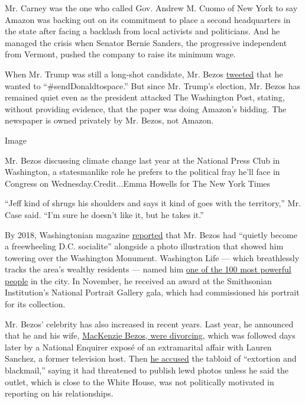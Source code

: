 Mr. Carney was the one who called Gov. Andrew M. Cuomo of New York to
say Amazon was backing out on its commitment to place a second
headquarters in the state after facing a backlash from local activists
and politicians. And he managed the crisis when Senator Bernie Sanders,
the progressive independent from Vermont, pushed the company to raise
its minimum wage.

When Mr. Trump was still a long-shot candidate, Mr. Bezos
\href{https://twitter.com/JeffBezos/status/674008204838199297}{tweeted}
that he wanted to ``\#sendDonaldtospace.'' But since Mr. Trump's
election, Mr. Bezos has remained quiet even as the president attacked
The Washington Post, stating, without providing evidence, that the paper
was doing Amazon's bidding. The newspaper is owned privately by Mr.
Bezos, not Amazon.

Image

Mr. Bezos discussing climate change last year at the National Press Club
in Washington, a statesmanlike role he prefers to the political fray
he'll face in Congress on Wednesday.Credit...Emma Howells for The New
York Times

``Jeff kind of shrugs his shoulders and says it kind of goes with the
territory,'' Mr. Case said. ``I'm sure he doesn't like it, but he takes
it.''

By 2018, Washingtonian magazine
\href{https://www.washingtonian.com/2018/04/22/inside-jeff-bezos-dc-life/}{reported}
that Mr. Bezos had ``quietly become a freewheeling D.C. socialite''
alongside a photo illustration that showed him towering over the
Washington Monument. Washington Life --- which breathlessly tracks the
area's wealthy residents --- named him
\href{https://washingtonlife.com/2018/05/10/business-real-estate-jeff-bezos/}{one
of the 100 most powerful people} in the city. In November, he received
an award at the Smithsonian Institution's National Portrait Gallery
gala, which had commissioned his portrait for its collection.

Mr. Bezos' celebrity has also increased in recent years. Last year, he
announced that he and his wife,
\href{https://www.nytimes3xbfgragh.onion/2019/05/28/us/mackenzie-bezos-charity.html}{MacKenzie
Bezos, were divorcing}, which was followed days later by a National
Enquirer exposé of an extramarital affair with Lauren Sanchez, a former
television host. Then
\href{https://www.nytimes3xbfgragh.onion/2019/02/07/technology/jeff-bezos-sanchez-enquirer.html}{he
accused} the tabloid of ``extortion and blackmail,'' saying it had
threatened to publish lewd photos unless he said the outlet, which is
close to the White House, was not politically motivated in reporting on
his relationships.

